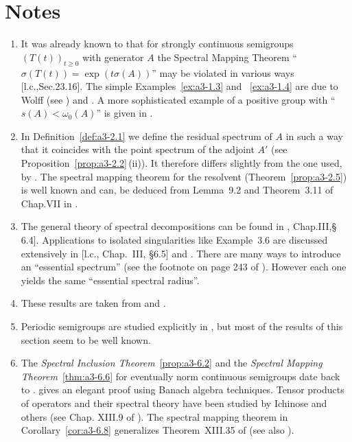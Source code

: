 \section*{Notes}\label{notes:a3-notes}
\begin{enumerate}[label=\emph{Section \arabic*:}, wide, itemsep=1ex]
\item 
It was already known to \textcite{hillephillips:1957} that for strongly continuous semigroups $(T(t))_{t\geq 0}$ with generator $A$ the Spectral Mapping Theorem \enquote{$\sigma(T(t)) = \exp(t\sigma(A))$} may be violated in various ways [l.c.,Sec.23.16].
The simple Examples~\ref{ex:a3-1.3} and ~\ref{ex:a3-1.4} are due to Wolff (see \textcite{greinervoigtwolff:1981}) and \textcite{zabczyk:1975}.
A more sophisticated example of a positive group with 
\enquote{$s(A) < \omega_{0}(A)$} is given in \textcite{wolff:1981}.

\item 
In Definition~\ref{def:a3-2.1} we define the residual spectrum of\/ $A$ in such a way that it coincides with the point spectrum of the adjoint $A'$ (see Proposition~\ref{prop:a3-2.2}\,(ii)).
It therefore differs slightly from the one used, \eg by \textcite{schaefer:1974}.
The spectral mapping theorem for the resolvent (Theorem~\ref{prop:a3-2.5}) is well known and can, \eg be deduced from Lemma~9.2 and Theorem~3.11 of Chap.VII in \textcite{dunfordschwartz:1958}.

\item 
The general theory of spectral decompositions can be found in \textcite{kato:1976}, Chap.III,§ 6.4].
Applications to isolated singularities like Example~3.6 are discussed extensively in [l.c., Chap.~III, §6.5] and \textcite[Chap.~VIII, Sec.8]{yosida:1965}.
There are many ways to introduce an \enquote{essential spectrum} (see the footnote on page 243 of \textcite{kato:1976}).
However each one yields the same \enquote{essential spectral radius}.

\item 
These results are taken from \textcite{derndinger:1980} and \textcite{greiner:1981}.

\item 
Periodic semigroups are studied explicitly in \textcite{bart:1977}, but most of the results of this section seem to be well known.

\item
The \emph{Spectral Inclusion Theorem}~\ref{prop:a3-6.2} and the 
\emph{Spectral Mapping Theorem}~\ref{thm:a3-6.6} for eventually norm continuous semigroups date back to \textcite{hillephillips:1957}.
\textcite{davies:1980} gives an elegant proof using Banach algebra techniques.
Tensor products of operators and their spectral theory have been studied by Ichinose and others (see Chap. XIII.9 of \textcite{reedsimon:1978}).
The spectral mapping theorem in Corollary~\ref{cor:a3-6.8} generalizes Theorem~XIII.35 of \textcite{reedsimon:1978} (see also \textcite{herbst:1982}).


\end{enumerate}
